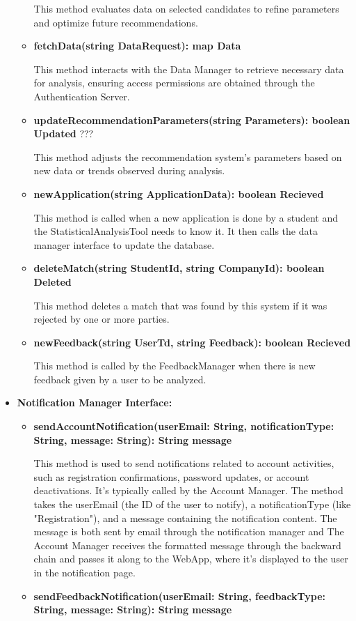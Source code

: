 \begin{itemize}
\begin{itemize}
    This method evaluates data on selected candidates to refine parameters and optimize future recommendations.

    \item \textbf{fetchData(string DataRequest): map Data}

    This method interacts with the Data Manager to retrieve necessary data for analysis, ensuring access permissions are obtained through the Authentication Server.

    \item \textbf{updateRecommendationParameters(string Parameters): boolean Updated} ???

    This method adjusts the recommendation system's parameters based on new data or trends observed during analysis.

    \item \textbf{newApplication(string ApplicationData): boolean Recieved}

    This method is called when a new application is done by a student and the StatisticalAnalysisTool needs to know it. It then calls the data manager interface to update the database.

    \item \textbf{deleteMatch(string StudentId, string CompanyId): boolean Deleted}

    This method deletes a match that was found by this system if it was rejected by one or more parties.

    \item \textbf{newFeedback(string UserTd, string Feedback): boolean Recieved}

    This method is called by the FeedbackManager when there is new feedback given by a user to be analyzed. 
    \end{itemize}


\item \textbf{Notification Manager Interface:}
\begin{itemize}
    \item \textbf{sendAccountNotification(userEmail: String, notificationType: String, message: String): String message}

    This method is used to send notifications related to account activities, such as registration confirmations, password updates, or account deactivations. It’s typically called by the Account Manager.
    The method takes the userEmail (the ID of the user to notify), a notificationType (like "Registration"), and a message containing the notification content. The message is both sent by email through the notification manager and The Account Manager receives the formatted message through the backward chain and passes it along to the WebApp, where it’s displayed to the user in the notification page.
    \item \textbf{sendFeedbackNotification(userEmail: String, feedbackType: String, message: String): String message
}


\end{itemize}
\end{itemize}

